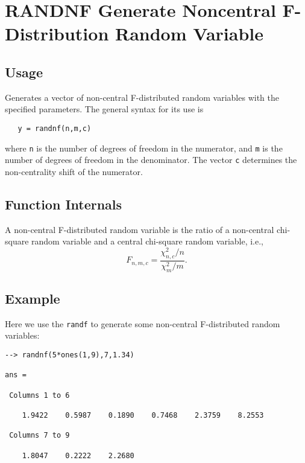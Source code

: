 \section{RANDNF Generate Noncentral F-Distribution Random Variable}

\subsection{Usage}

Generates a vector of non-central F-distributed random variables
with the specified parameters.  The general syntax for its use is
\begin{verbatim}
   y = randnf(n,m,c)
\end{verbatim}
where \verb|n| is the number of degrees of freedom in the numerator,
and \verb|m| is the number of degrees of freedom in the denominator.
The vector \verb|c| determines the non-centrality shift of the numerator.
\subsection{Function Internals}

A non-central F-distributed random variable is the ratio of a
non-central chi-square random variable and a central chi-square random
variable, i.e.,
\[
   F_{n,m,c} = \frac{\chi_{n,c}^2/n}{\chi_m^2/m}.
\]
\subsection{Example}

Here we use the \verb|randf| to generate some non-central F-distributed
random variables:
\begin{verbatim}
--> randnf(5*ones(1,9),7,1.34)

ans = 

 Columns 1 to 6

    1.9422    0.5987    0.1890    0.7468    2.3759    8.2553 

 Columns 7 to 9

    1.8047    0.2222    2.2680 
\end{verbatim}
